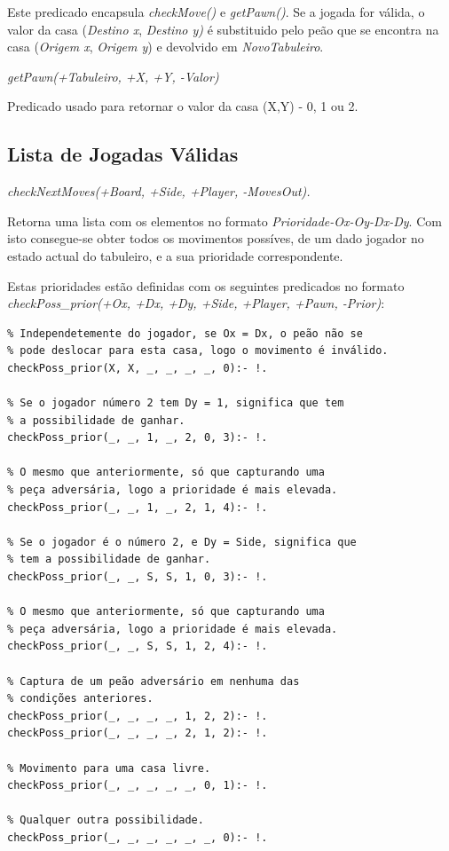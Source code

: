 \documentclass[15pt,a4paper]{article}
\begin{document}
Este predicado encapsula \textit{checkMove()} e \textit{getPawn()}.
Se a jogada for válida, o valor da casa (\textit{Destino x}, \textit{Destino y)} é substituido pelo
peão que se encontra na casa (\textit{Origem x}, \textit{Origem y}) e devolvido em \textit{NovoTabuleiro}.

\textit{getPawn(+Tabuleiro, +X, +Y, -Valor)}

Predicado usado para retornar o valor da casa (X,Y) - 0, 1 ou 2.


\subsection{Lista de Jogadas Válidas}

\textit{checkNextMoves(+Board, +Side, +Player, -MovesOut).}

Retorna uma lista com os elementos no formato \textit{Prioridade-Ox-Oy-Dx-Dy}.
Com isto consegue-se obter todos os movimentos possíves, de um dado jogador no estado actual do tabuleiro, e a sua prioridade correspondente.

Estas prioridades estão definidas com os seguintes predicados no formato
\textit{checkPoss\_prior(+Ox, +Dx, +Dy, +Side, +Player, +Pawn, -Prior)}:

\newpage

\begin{lstlisting}
% Independetemente do jogador, se Ox = Dx, o peão não se
% pode deslocar para esta casa, logo o movimento é inválido.
checkPoss_prior(X, X, _, _, _, _, 0):- !.

% Se o jogador número 2 tem Dy = 1, significa que tem
% a possibilidade de ganhar.
checkPoss_prior(_, _, 1, _, 2, 0, 3):- !.

% O mesmo que anteriormente, só que capturando uma
% peça adversária, logo a prioridade é mais elevada.
checkPoss_prior(_, _, 1, _, 2, 1, 4):- !.

% Se o jogador é o número 2, e Dy = Side, significa que
% tem a possibilidade de ganhar.
checkPoss_prior(_, _, S, S, 1, 0, 3):- !.

% O mesmo que anteriormente, só que capturando uma
% peça adversária, logo a prioridade é mais elevada.
checkPoss_prior(_, _, S, S, 1, 2, 4):- !.

% Captura de um peão adversário em nenhuma das
% condições anteriores.
checkPoss_prior(_, _, _, _, 1, 2, 2):- !.
checkPoss_prior(_, _, _, _, 2, 1, 2):- !.

% Movimento para uma casa livre.
checkPoss_prior(_, _, _, _, _, 0, 1):- !.

% Qualquer outra possibilidade.
checkPoss_prior(_, _, _, _, _, _, 0):- !.
\end{lstlisting}
\end{document}
